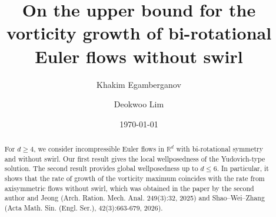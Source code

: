 \documentclass[11pt]{amsart}
\newcommand{\Red}[1]{\begingroup\color{red} #1\endgroup} %
\theoremstyle{definition}
\theoremstyle{remark}
\numberwithin{equation}{section}
\numberwithin{equation}{section}
\newcommand{\0}{\emptyset}
\newcommand{\bbR}{\mathbb R}
\begin{document}
	
	
	\title{On the upper bound for the vorticity growth of bi-rotational Euler flows without swirl}
	
	
	\renewcommand{\thefootnote}{\fnsymbol{footnote}}
	\renewcommand{\thefootnote}{\arabic{footnote}}
	
	\author{Khakim Egamberganov}
	\address{Department of Mathematics, National University of Singapore, Block S17, 10 Lower Kent Ridge Road, Singapore, 119076, Singapore}
	
	
	\author{Deokwoo Lim}
	\address{School of Mathematics, Korea Institute for Advanced Study, 85 Hoegi-ro, Dongdaemun-gu, Seoul, 02455, Republic of Korea.}
	
	
	\date\today
	\maketitle
	
\begin{abstract}
		For $d\geq 4$, we consider incompressible Euler flows in $\bbR^{d}$ with bi-rotational symmetry and without swirl. Our first result gives the local wellposedness of the Yudovich-type solution. The second result provides global wellposedness up to $d\leq 6$. In particular, it shows that the rate of growth of the vorticity maximum coincides with the rate from axisymmetric flows without swirl, which was obtained in the paper by the second author and Jeong (Arch. Ration. Mech. Anal. 249(3):32, 2025) and Shao--Wei--Zhang (Acta Math. Sin. (Engl. Ser.), 42(3):663-679, 2026).
	\end{abstract}
	
	
	
	\medskip
	
	
\end{document}
